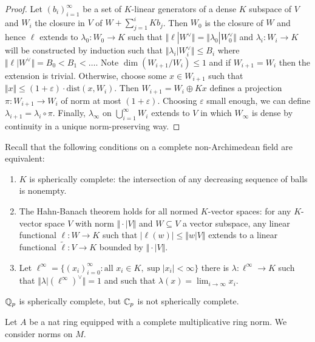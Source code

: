 \begin{proof}
    Let $(b_{i})_{i=1}^{\infty}$ be a set of $K$-linear generators of a dense $K$ subspace of $V$ and $W_{i}$ the closure in $V$ of $W+\sum_{j=1}^{i}K b_{j}$. Then $W_{0}$ is the closure of $W$ and hence $\ell$ extends to $\lambda_{0}:W_{0}\to K$ such that $\Vert\ell|W^{\vee}\Vert=\Vert\lambda_{0}|W_{0}^{\vee}\Vert$ and $\lambda_{i}:W_{i}\to K$ will be constructed by induction such that $\Vert\lambda_{i}|W_{i}^{\vee}\Vert\leq B_{i}$ where $\Vert\ell|W^{\vee}\Vert=B_{0}<B_{1}<\dots$. Note $\dim(W_{i+1}/W_{i})\leq 1$ and if $W_{i+1}=W_{i}$ then the extension is trivial. Otherwise, choose some $x\in W_{i+1}$ such that $\Vert x\Vert\leq (1+\varepsilon)\cdot\mathrm{dist}(x,W_{i})$. Then $W_{i+1}=W_{i}\oplus Kx$ defines a projection $\pi:W_{i+1}\to W_{i}$ of norm at most $(1+\varepsilon)$. Choosing $\varepsilon$ small enough, we can define $\lambda_{i+1}=\lambda_{i}\circ\pi$. Finally, $\lambda_{\infty}$ on $\bigcup_{i=1}^{\infty}W_{i}$ extends to $V$ in which $W_{\infty}$ is dense by continuity in a unique norm-preserving way. 
\end{proof}
\begin{remark}
    Recall that the following conditions on a complete non-Archimedean field are equivalent: 
    \begin{enumerate}[label=(\roman*)]
        \item $K$ is spherically complete: the intersection of any decreasing sequence of balls is nonempty. 
        \item The Hahn-Banach theorem holds for all normed $K$-vector spaces: for any $K$-vector space $V$ with norm $\Vert\cdot|V\Vert$ and $W\subseteq V$ a vector subspace, any linear functional $\ell:W\to K$ such that $|\ell(w)|\leq\Vert w|V\Vert$ extends to a linear functional $\widetilde{\ell}:V\to K$ bounded by $\Vert\cdot|V\Vert$. 
        \item Let $\ell^{\infty}=\{(x_{i})_{i=0}^{\infty}:\text{all }x_{i}\in K, \sup|x_{i}|<\infty\}$ there is $\lambda:\ell^{\infty}\to K$ such that $\Vert\lambda|(\ell^{\infty})^{\vee}\Vert=1$ and such that $\lambda(x)=\lim_{i\to\infty}x_{i}$. 
    \end{enumerate}
\end{remark}
\begin{example}
    $\mathbb{Q}_{p}$ is spherically complete, but $\mathbb{C}_{p}$ is not spherically complete. 
\end{example}
Let $A$ be a nat ring  equipped with a complete multiplicative ring norm. We consider norms on $M$. 
